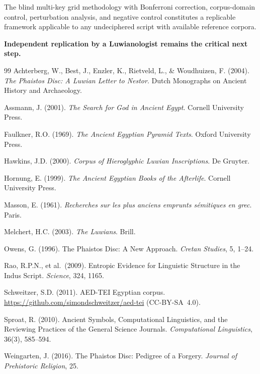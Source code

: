 \documentclass[12pt,a4paper]{article}
\begin{document}
The blind multi-key grid methodology with Bonferroni correction, corpus-domain control, perturbation analysis, and negative control constitutes a replicable framework applicable to any undeciphered script with available reference corpora.

\textbf{Independent replication by a Luwianologist remains the critical next step.}

\begin{thebibliography}{99}
 Achterberg, W., Best, J., Enzler, K., Rietveld, L., \& Woudhuizen, F. (2004). \textit{The Phaistos Disc: A Luwian Letter to Nestor}. Dutch Monographs on Ancient History and Archaeology.

 Assmann, J. (2001). \textit{The Search for God in Ancient Egypt}. Cornell University Press.

 Faulkner, R.O. (1969). \textit{The Ancient Egyptian Pyramid Texts}. Oxford University Press.

 Hawkins, J.D. (2000). \textit{Corpus of Hieroglyphic Luwian Inscriptions}. De Gruyter.

 Hornung, E. (1999). \textit{The Ancient Egyptian Books of the Afterlife}. Cornell University Press.

 Masson, E. (1961). \textit{Recherches sur les plus anciens emprunts sémitiques en grec}. Paris.

 Melchert, H.C. (2003). \textit{The Luwians}. Brill.

 Owens, G. (1996). The Phaistos Disc: A New Approach. \textit{Cretan Studies}, 5, 1--24.

 Rao, R.P.N., et al.\ (2009). Entropic Evidence for Linguistic Structure in the Indus Script. \textit{Science}, 324, 1165.

 Schweitzer, S.D. (2011). AED-TEI Egyptian corpus. \url{https://github.com/simondschweitzer/aed-tei} (CC-BY-SA~4.0).

 Sproat, R. (2010). Ancient Symbols, Computational Linguistics, and the Reviewing Practices of the General Science Journals. \textit{Computational Linguistics}, 36(3), 585--594.

 Weingarten, J. (2016). The Phaistos Disc: Pedigree of a Forgery. \textit{Journal of Prehistoric Religion}, 25.
\end{thebibliography}
\end{document}
